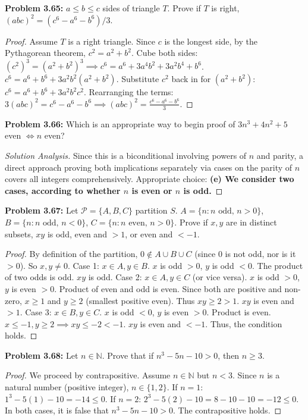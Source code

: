 \documentclass[11pt, letterpaper]{article}
\theoremstyle{definition}
\theoremstyle{remark}
\newcommand{\N}{\mathbb{N}}
\begin{document}
\textbf{Problem 3.65:} $a \le b \le c$ sides of triangle $T$. Prove if $T$ is right, $(abc)^2 = (c^6 - a^6 - b^6)/3$.
\begin{proof}
Assume $T$ is a right triangle. Since $c$ is the longest side, by the Pythagorean theorem, $c^2 = a^2 + b^2$.
Cube both sides:
$(c^2)^3 = (a^2+b^2)^3 \implies c^6 = a^6 + 3a^4b^2 + 3a^2b^4 + b^6$.
$c^6 = a^6 + b^6 + 3a^2b^2(a^2+b^2)$.
Substitute $c^2$ back in for $(a^2+b^2)$:
$c^6 = a^6 + b^6 + 3a^2b^2c^2$.
Rearranging the terms:
$3(abc)^2 = c^6 - a^6 - b^6 \implies (abc)^2 = \frac{c^6 - a^6 - b^6}{3}$.
\end{proof}

\textbf{Problem 3.66:} Which is an appropriate way to begin proof of $3n^3+4n^2+5$ even $\iff n$ even?
\begin{proof}[Solution Analysis]
Since this is a biconditional involving powers of $n$ and parity, a direct approach proving both implications separately via cases on the parity of $n$ covers all integers comprehensively.
Appropriate choice: \textbf{(e) We consider two cases, according to whether $n$ is even or $n$ is odd.}
\end{proof}

\textbf{Problem 3.67:} Let $\mathcal{P} = \{A, B, C\}$ partition $S$. $A=\{n: n \text{ odd, } n>0\}$, $B=\{n: n \text{ odd, } n<0\}$, $C=\{n: n \text{ even, } n>0\}$. Prove if $x,y$ are in distinct subsets, $xy$ is odd, even and $>1$, or even and $<-1$.
\begin{proof}
By definition of the partition, $0 \notin A \cup B \cup C$ (since 0 is not odd, nor is it $>0$). So $x,y \neq 0$.
Case 1: $x \in A, y \in B$. $x$ is odd $>0$, $y$ is odd $<0$. The product of two odds is odd. $xy$ is odd.
Case 2: $x \in A, y \in C$ (or vice versa). $x$ is odd $>0$, $y$ is even $>0$. Product of even and odd is even. Since both are positive and non-zero, $x \ge 1$ and $y \ge 2$ (smallest positive even). Thus $xy \ge 2 > 1$. $xy$ is even and $>1$.
Case 3: $x \in B, y \in C$. $x$ is odd $<0$, $y$ is even $>0$. Product is even. $x \le -1, y \ge 2 \implies xy \le -2 < -1$. $xy$ is even and $<-1$.
Thus, the condition holds.
\end{proof}

\textbf{Problem 3.68:} Let $n \in \N$. Prove that if $n^3 - 5n - 10 > 0$, then $n \ge 3$.
\begin{proof}
We proceed by contrapositive. Assume $n \in \N$ but $n < 3$. 
Since $n$ is a natural number (positive integer), $n \in \{1, 2\}$.
If $n = 1$: $1^3 - 5(1) - 10 = -14 \le 0$.
If $n = 2$: $2^3 - 5(2) - 10 = 8 - 10 - 10 = -12 \le 0$.
In both cases, it is false that $n^3 - 5n - 10 > 0$. The contrapositive holds.
\end{proof}
\end{document}
